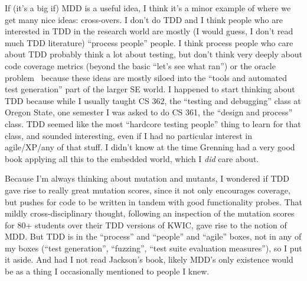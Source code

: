 \documentclass[sigplan,screen]{acmart}
\begin{document}
If (it's a big if) MDD is a useful idea, I think it's a minor example
of where we get many nice ideas:  cross-overs.  I don't do TDD and
I think people who are interested in TDD in the research world are
mostly (I would guess, I don't read much TDD literature) ``process people''
people.  I think process people who care about TDD probably think
a lot about testing, but don't think very deeply about code coverage
metrics (beyond the basic ``let's see what ran'') or the oracle
problem~\cite{staats2011programs,oracleMcMinn} because these ideas are mostly siloed into the ``tools and
automated test generation'' part of the larger SE world.  I happened
to start thinking about TDD because while I usually taught CS 362, the
``testing and debugging'' class at Oregon State, one semester I was
asked to do CS 361, the ``design and process'' class.  TDD seemed like
the most ``hardcore testing people'' thing to learn for that class,
and sounded interesting, even if I had no particular interest in
agile/XP/any of that stuff.  I didn't know at the time Grenning
had a very good book applying all this to the embedded world, which I
\emph{did} care about.

Because I'm always thinking about mutation and mutants, I wondered if
TDD gave rise to really great mutation scores, since it not only
encourages coverage, but pushes for code to be written in tandem with
good functionality probes.  That mildly cross-disciplinary
thought, following an inspection of the mutation scores for 80+
students over their TDD versions of KWIC,
gave rise to the notion of MDD.  But TDD is in the ``process'' and
``people'' and ``agile'' boxes, not in any of my boxes (``test
generation'', ``fuzzing'', ``test suite evaluation measures''), so I
put it aside.  And had I not read Jackson's book, likely MDD's only
existence would be as a thing I occasionally mentioned to people I knew.
\end{document}
